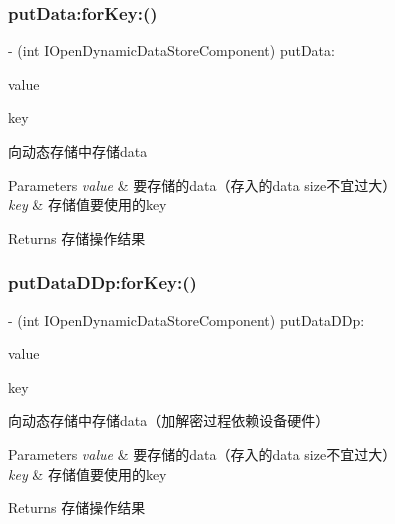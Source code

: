 \subsubsection{\texorpdfstring{put\+Data\+:for\+Key\+:()}{putData:forKey:()}}
{\footnotesize\ttfamily -\/ (int I\+Open\+Dynamic\+Data\+Store\+Component) put\+Data\+: \begin{DoxyParamCaption}\item[{(N\+S\+Data $\ast$)}]{value }\item[{forKey:(N\+S\+String $\ast$)}]{key }\end{DoxyParamCaption}}

向动态存储中存储data 
\begin{DoxyParams}{Parameters}
{\em value} & 要存储的data（存入的data size不宜过大） \\
\hline
{\em key} & 存储值要使用的key \\
\hline
\end{DoxyParams}
\begin{DoxyReturn}{Returns}
存储操作结果 
\end{DoxyReturn}
\mbox{\label{protocol_i_open_dynamic_data_store_component_01-p_aaf0245f9535bcb3f109afc17c661ccc0}} 
\subsubsection{\texorpdfstring{put\+Data\+D\+Dp\+:for\+Key\+:()}{putDataDDp:forKey:()}}
{\footnotesize\ttfamily -\/ (int I\+Open\+Dynamic\+Data\+Store\+Component) put\+Data\+D\+Dp\+: \begin{DoxyParamCaption}\item[{(N\+S\+Data $\ast$)}]{value }\item[{forKey:(N\+S\+String $\ast$)}]{key }\end{DoxyParamCaption}}

向动态存储中存储data（加解密过程依赖设备硬件） 
\begin{DoxyParams}{Parameters}
{\em value} & 要存储的data（存入的data size不宜过大） \\
\hline
{\em key} & 存储值要使用的key \\
\hline
\end{DoxyParams}
\begin{DoxyReturn}{Returns}
存储操作结果 
\end{DoxyReturn}
\mbox{\label{protocol_i_open_dynamic_data_store_component_01-p_ac70899734e626501b98c25f0a15c74ca}} 
